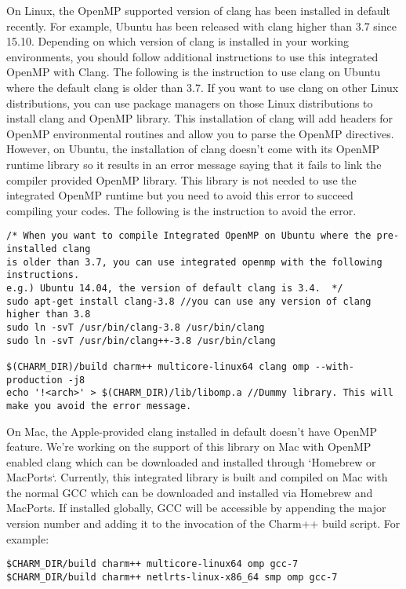 On Linux, the OpenMP supported version of clang has been installed in default recently. For example, 
Ubuntu has been released with clang higher than 3.7 since 15.10.
Depending on which version of clang is installed in your working environments, you should follow additional instructions
to use this integrated OpenMP with Clang. The following is the instruction to use 
clang on Ubuntu where the default clang is older than 3.7. If you want to use clang on other Linux 
distributions, you can use package managers on those Linux distributions to install clang and OpenMP library. 
This installation of clang will add headers for OpenMP environmental routines and allow you to parse the OpenMP directives.
However, on Ubuntu, the installation of clang doesn't come with its OpenMP runtime library so it results in an error message saying that
it fails to link the compiler provided OpenMP library. This library is not needed to use the integrated OpenMP runtime but you
need to avoid this error to succeed compiling your codes. The following is the instruction to avoid the error. 

\begin{verbatim}
/* When you want to compile Integrated OpenMP on Ubuntu where the pre-installed clang
is older than 3.7, you can use integrated openmp with the following instructions.
e.g.) Ubuntu 14.04, the version of default clang is 3.4.  */
sudo apt-get install clang-3.8 //you can use any version of clang higher than 3.8
sudo ln -svT /usr/bin/clang-3.8 /usr/bin/clang
sudo ln -svT /usr/bin/clang++-3.8 /usr/bin/clang

$(CHARM_DIR)/build charm++ multicore-linux64 clang omp --with-production -j8 
echo '!<arch>' > $(CHARM_DIR)/lib/libomp.a //Dummy library. This will make you avoid the error message.
\end{verbatim}

On Mac, the Apple-provided clang installed in default doesn't have OpenMP feature. We're working on the support of 
this library on Mac with OpenMP enabled clang which can be downloaded and installed through `Homebrew or MacPorts`.
Currently, this integrated library is built and compiled on Mac with the normal GCC which can be downloaded and 
installed via Homebrew and MacPorts. If installed globally, GCC will be accessible by appending the major version
number and adding it to the invocation of the Charm++ build script. For example:\\
\begin{verbatim}
$CHARM_DIR/build charm++ multicore-linux64 omp gcc-7
$CHARM_DIR/build charm++ netlrts-linux-x86_64 smp omp gcc-7
\end{verbatim}

